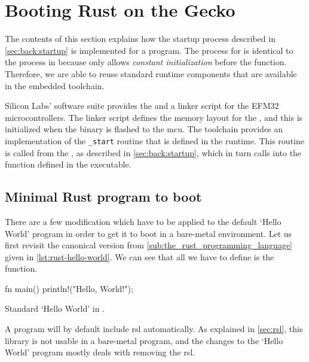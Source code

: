 \section{Booting Rust on the Gecko}
\label{sec:impl:booting}

The contents of this section explains how the startup process described in \autoref{sec:back:startup} is implemented for a {\rust} program.
The process for {\rust} is identical to the process in {\C} because {\rust} only allows \emph{constant initialization} before the {\main} function.
Therefore, we are able to reuse standard runtime components that are available in the {\C} embedded toolchain.

Silicon Labs' software suite provides the  and a linker script for the EFM32 microcontrollers.
The linker script defines the memory layout for the {\gecko}, and this is initialized when the  binary is flashed to the \gls{mcu}.
The {\armgcc} toolchain provides an implementation of the \texttt{\_start} routine that is defined in the {\C} runtime.
This routine is called from the {}, as described in \autoref{sec:back:startup}, which in turn calls into the  function defined in the {\rust} executable.

\subsection{Minimal Rust program to boot}
\label{ssec:minimal_rust_program_to_boot}

There are a few modification which have to be applied to the default `Hello World' program in order to get it to boot in a bare-metal environment.
Let us first revisit the canonical version from \autoref{sub:the_rust_programming_language} given in \autoref{lst:rust-hello-world}.
We can see that all we have to define is the  function.

\begin{listing}[H]
  \begin{rustcode}
fn main() {
  println!("Hello, World!");
}
  \end{rustcode}
  \caption{Standard `Hello World' in {\rust}.}
  \label{lst:rust-hello-world}
\end{listing}

A {\rust} program will by default include \glsdesc{rsl} automatically.
As explained in \autoref{sec:rsl}, this library is not usable in a bare-metal program, and the changes to the `Hello World' program mostly deals with removing the \gls{rsl}.

